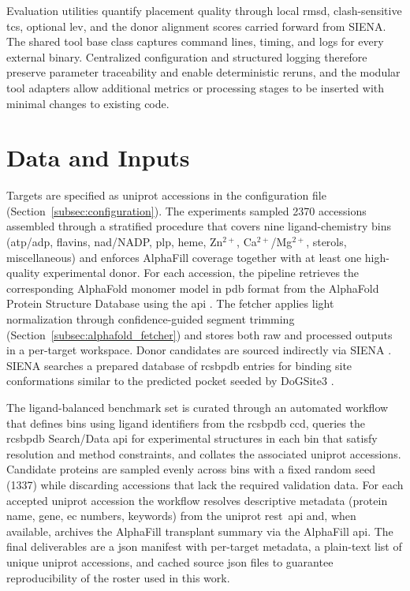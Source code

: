 Evaluation utilities quantify placement quality through local \gls{rmsd}, clash-sensitive \gls{tcs}, optional \gls{lev}, and the donor alignment scores carried forward from SIENA. The shared tool base class captures command lines, timing, and logs for every external binary. Centralized configuration and structured logging therefore preserve parameter traceability and enable deterministic reruns, and the modular tool adapters allow additional metrics or processing stages to be inserted with minimal changes to existing code.

\section{Data and Inputs}\label{sec:data-and-inputs}
Targets are specified as \gls{uniprot} accessions in the configuration file (Section~\ref{subsec:configuration}). The experiments sampled \num{2370} accessions assembled through a stratified procedure that covers nine ligand-chemistry bins (\gls{atp}/\gls{adp}, flavins, \gls{nad}/NADP, \gls{plp}, heme, Zn$^{2+}$, Ca$^{2+}$/Mg$^{2+}$, sterols, miscellaneous) and enforces AlphaFill coverage together with at least one high-quality experimental donor. For each accession, the pipeline retrieves the corresponding AlphaFold monomer model in \gls{pdb} format from the AlphaFold Protein Structure Database \cite{varadiAlphaFoldProteinStructure2022} using the \gls{api} \cite{AlphaFoldProteinStructurea}. The fetcher applies light normalization through confidence-guided segment trimming (Section~\ref{subsec:alphafold_fetcher}) and stores both raw and processed outputs in a per-target workspace. Donor candidates are sourced indirectly via SIENA \cite{bietzSIENAEfficientCompilation2016}. SIENA searches a prepared database of \gls{rcsbpdb} \cite{burleyRCSBProteinData2019} entries for binding site conformations similar to the predicted pocket seeded by DoGSite3 \cite{graefBindingSiteDetection2023}.

The ligand-balanced benchmark set is curated through an automated workflow that defines bins using ligand identifiers from the \gls{rcsbpdb} \gls{ccd}, queries the \gls{rcsbpdb} Search/Data \gls{api} for experimental structures in each bin that satisfy resolution and method constraints, and collates the associated \gls{uniprot} accessions. Candidate proteins are sampled evenly across bins with a fixed random seed (1337) while discarding accessions that lack the required validation data. For each accepted \gls{uniprot} accession the workflow resolves descriptive metadata (protein name, gene, \gls{ec} numbers, keywords) from the \gls{uniprot} \gls{rest}~\gls{api} and, when available, archives the AlphaFill transplant summary via the AlphaFill \gls{api}. The final deliverables are a \gls{json} manifest with per-target metadata, a plain-text list of unique \gls{uniprot} accessions, and cached source \gls{json} files to guarantee reproducibility of the roster used in this work.


